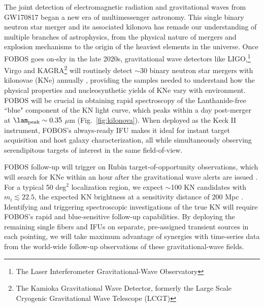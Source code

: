 \documentclass[11pt,a4paper,twoside,onecolumn,openany,final,oldfontcommands]{memoir}
\begin{document}
The joint detection of electromagnetic radiation and gravitational waves from GW170817 began a new era of multimessenger astronomy.  This single binary neutron star merger and its associated kilonova has remade our understanding of multiple branches of astrophysics, from the physical nature of mergers and explosion mechanisms to the origin of the heaviest elements in the universe.  Once FOBOS goes on-sky in the late 2020s, gravitational wave detectors like LIGO,\footnote{The Laser Interferometer Gravitational-Wave Observatory} Virgo and KAGRA\footnote{The Kamioka Gravitational Wave Detector, formerly the Large Scale Cryogenic Gravitational Wave Telescope (LCGT)} will routinely detect $\sim$30 binary neutron star mergers with kilonovae (KNe) annually \citep{abbott2018prospects}, providing the samples needed to understand how the physical properties and nucleosynthetic yields of KNe vary with environment.  FOBOS will be crucial in obtaining rapid spectroscopy of the Lanthanide-free ``blue" component of the KN light curve, which peaks within a day post-merger at $\lam_\mathrm{peak}\sim0.35$ $\mu$m (Fig.~\ref{fig:kilonova}). When deployed as the Keck II instrument, FOBOS's always-ready IFU makes it ideal for instant target acquisition and host galaxy characterization, all while simultaneously observing serendipitous targets of interest in the same field-of-view. 


FOBOS follow-up will trigger on Rubin target-of-opportunity observations, which will search for KNe within an hour after the gravitational wave alerts are issued \citep[assuming the strategy proposed by][]{margutti2018}. For a typical 50 deg$^2$ localization region, we expect $\sim$100 KN candidates with $m_i\lesssim22.5$, the expected KN brightness at a sensitivity distance of 200 Mpc \citep{cowperthwaite2017, goldstein2019}. Identifying and triggering spectroscopic investigations of the true KN will require FOBOS's rapid and blue-sensitive follow-up capabilities.  By deploying the remaining single fibers and IFUs on separate, pre-assigned transient sources in each pointing, we will take maximum advantage of synergies with time-series data from the world-wide follow-up observations of these gravitational-wave fields. 
\end{document}
